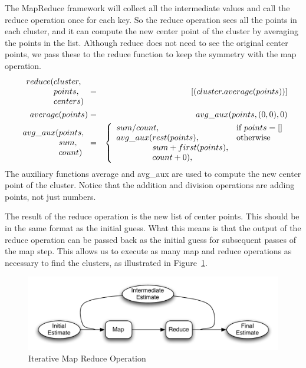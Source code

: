 The MapReduce framework will collect all the intermediate values and call the reduce
operation once for each key.  So the reduce operation sees all the points in each
cluster, and it can compute the new center point of the cluster by averaging the points
in the list.  Although reduce does not need to see the original center points, we pass
these to the reduce function to keep the symmetry with the map operation.
\begin{eqnarray*}
	\begin{array}{l@{}l}
		reduce(&cluster, \\
			   &points, \\
			   &centers)
	\end{array} &=& [ ( cluster . average(points) ) ] \\
average(points) &=& avg\_aux(points, (0,0), 0) \\
\begin{array}{l@{}l}
	avg\_aux(&points, \\
				 &sum, \\
				 &count)
\end{array} &=&
	\left\{
		\begin{array}{l@{}ll}
    		\multicolumn{2}{l}{sum / count,}  & \mbox{if } points = [] \\
    		avg\_aux(& rest(points),          & \mbox{otherwise} \\
					 & sum+first(points),     & \\
					 & count+0),              & \\
		\end{array}
	\right.
\end{eqnarray*}
The auxiliary functions average and avg\_aux are used to compute the new center point
of the cluster.  Notice that the addition and division operations are adding points,
not just numbers.

The result of the reduce operation is the new list of center points.  This should be
in the same format as the initial guess.  What this means is that the output of the
reduce operation can be passed back as the initial guess for subsequent passes of the
map step.  This allows us to execute as many map and reduce operations as necessary
to find the clusters, as illustrated in Figure~\ref{iterative-map-reduce}.

\begin{figure}
	\begin{center}
		\includegraphics[scale=0.7]{images/iterative-map-reduce}
	\end{center}
	\caption{Iterative Map Reduce Operation}
	\label{iterative-map-reduce}
\end{figure}

